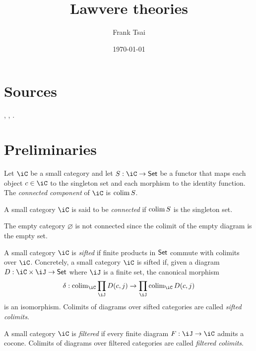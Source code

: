 \documentclass{zett}
\title{Lawvere theories}
\author{Frank Tsai}
\date{\today}
\begin{document}
\maketitle
\tableofcontents

\section{Sources}
\label{sec:sources}

\cite{borger91:generators}, \cite{lawvere63:functsem}, \cite{adamek10:algebraic}.

\section{Preliminaries}
\label{sec:preliminaries}

\begin{defn}
  Let $\iC$ be a small category and let $S : \iC \to \CSet$ be a functor that maps each object $c \in \iC$ to the singleton set and each morphism to the identity function.
  The \emph{connected component} of $\iC$ is $\operatorname{colim} S$.
\end{defn}

\begin{defn}
  A small category $\iC$ is said to be \emph{connected} if $\operatorname{colim} S$ is the singleton set.
\end{defn}

\begin{rmk}
  The empty category $\varnothing$ is not connected since the colimit of the empty diagram is the empty set.
\end{rmk}

\begin{defn}\label{defn:sifted-categories}
  A small category $\iC$ is \emph{sifted} if finite products in $\mathsf{Set}$ commute with colimits over $\iC$.
  Concretely, a small category $\iC$ is sifted if, given a diagram $D : \iC \times \iJ \to \CSet$ where $\iJ$ is a finite set, the canonical morphism
  \[
    \delta : \colim_{\iC}\prod_{\iJ}D(c,j) \to \prod_{\iJ}\colim_{\iC}D(c,j)
  \]
  is an isomorphism.
  Colimits of diagrams over sifted categories are called \emph{sifted colimits}.
\end{defn}

\begin{defn}
  A small category $\iC$ is \emph{filtered} if every finite diagram $F : \iJ \to \iC$ admits a cocone.
  Colimits of diagrams over filtered categories are called \emph{filtered colimits}.
\end{defn}
\end{document}
